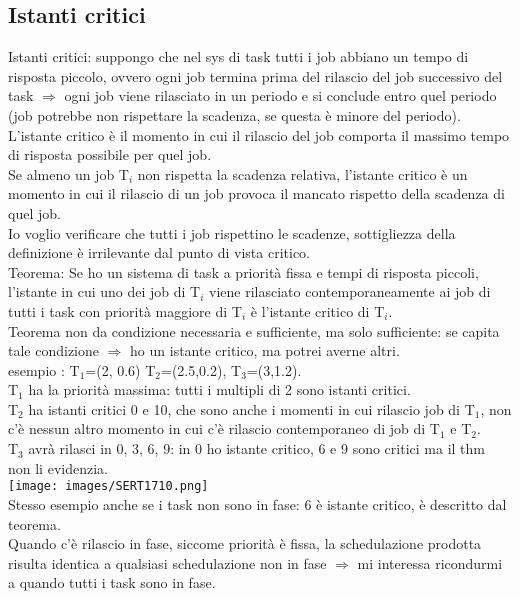 \documentclass[18px]{article}
\begin{document}
\subsection{Istanti critici}
Istanti critici: suppongo che nel sys di task tutti i job abbiano un tempo di risposta piccolo, ovvero ogni job termina prima del rilascio del job successivo del task $\Rightarrow$ ogni job viene rilasciato in un periodo e si conclude entro quel periodo (job potrebbe non rispettare la scadenza, se questa è minore del periodo).\\ L'istante critico è il momento in cui il rilascio del job comporta il massimo tempo di risposta possibile  per quel job.\\ Se almeno un job T$_{i}$ non rispetta la scadenza relativa, l'istante critico è un momento in cui il rilascio di un job provoca il mancato rispetto della scadenza di quel job.\\ Io voglio verificare che tutti i job rispettino le scadenze, sottigliezza della definizione è irrilevante dal punto di vista critico.\\ Teorema: Se ho un sistema di task a priorità fissa e tempi di risposta piccoli, l'istante in cui uno dei job di T$_{i}$  viene rilasciato contemporaneamente ai job di tutti i task con priorità maggiore di T$_{i}$ è l'istante critico di T$_{i}$.\\ Teorema non da condizione necessaria e sufficiente, ma solo sufficiente: se capita tale condizione $\Rightarrow$ ho un istante critico, ma potrei averne altri.\\ esempio : T$_{1}$=(2, 0.6) T$_{2}$=(2.5,0.2), T$_{3}$=(3,1.2).\\ T$_{1}$ ha la priorità massima: tutti i multipli di 2 sono istanti critici.\\ T$_{2}$ ha istanti critici 0 e 10, che sono anche i momenti in cui rilascio job di T$_{1}$, non c'è nessun altro momento in cui c'è rilascio contemporaneo di job di T$_{1}$ e T$_{2}$.\\ T$_{3}$ avrà rilasci in 0, 3, 6, 9: in 0 ho istante critico, 6 e 9 sono critici ma il thm non li evidenzia.\\
\texttt{[image: images/SERT1710.png]}\\
Stesso esempio anche se i task non sono in fase: 6 è istante critico, è descritto dal teorema.\\ Quando c'è rilascio in fase, siccome priorità è fissa, la schedulazione prodotta risulta identica a qualsiasi schedulazione non in fase $\Rightarrow$ mi interessa ricondurmi a quando tutti i task sono in fase.
\end{document}
